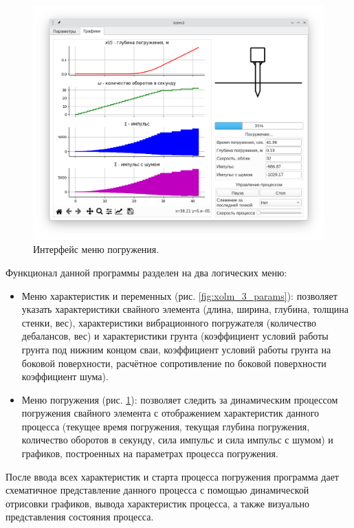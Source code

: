 \begin{figure}[h]
    \centering
    \includegraphics[width=1\linewidth]{img/xolm_3_linux_graps.png}
    \caption{Интерфейс меню погружения.}
    \label{fig:xolm_3_graps}
\end{figure}

Функционал данной программы разделен на два логических меню:
\begin{itemize}
    \item Меню характеристик и переменных (рис. \ref{fig:xolm_3_params}):
    позволяет указать характеристики свайного элемента (длина, ширина, глубина, толщина стенки, вес),
    характеристики вибрационного погружателя (количество дебалансов, вес) и характеристики грунта
    (коэффициент условий работы грунта под нижним концом сваи, коэффициент условий работы грунта на боковой поверхности,
    расчётное сопротивление по боковой поверхности коэффициент шума).
    \item Меню погружения (рис. \ref{fig:xolm_3_graps}):
    позволяет следить за динамическим процессом погружения свайного элемента с отображением характеристик данного процесса
    (текущее время погружения, текущая глубина погружения, количество оборотов в секунду, сила импульс и сила импульс с шумом)
    и графиков, построенных на параметрах процесса погружения.
\end{itemize}

После ввода всех характеристик и старта процесса погружения программа дает схематичное представление данного процесса с помощью динамической отрисовки графиков,
вывода характеристик процесса, а также визуально представления состояния процесса.

